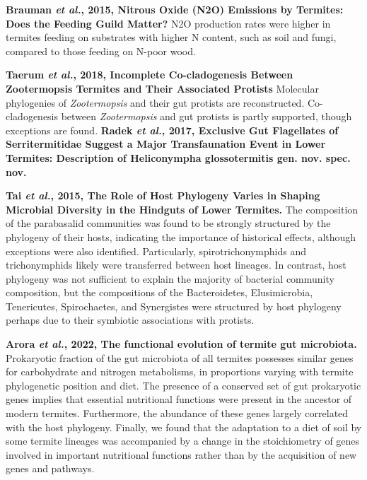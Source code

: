 \documentclass[11pt]{article}
\begin{document}
\begin{sloppypar}
\par
\textbf{Brauman \textit{et al.}, 2015, Nitrous Oxide (N2O) Emissions by Termites: Does the Feeding Guild Matter?} \newline
N2O production rates were higher in termites feeding on substrates with higher N content, such as soil and fungi, compared to those feeding on N-poor wood.
\par
\textbf{Taerum \textit{et al.}, 2018, Incomplete Co-cladogenesis Between Zootermopsis Termites and Their Associated Protists} \newline
Molecular phylogenies of \textit{Zootermopsis} and their gut protists are reconstructed. 
Co-cladogenesis between \textit{Zootermopsis} and gut protists is partly supported, though exceptions are found. 
\textbf{Radek \textit{et al.}, 2017, Exclusive Gut Flagellates of Serritermitidae Suggest a Major Transfaunation Event in Lower Termites: Description of Heliconympha glossotermitis gen. nov. spec. nov.} \newline
\par
\textbf{Tai \textit{et al.}, 2015, The Role of Host Phylogeny Varies in Shaping Microbial Diversity in the Hindguts of Lower Termites.} \newline
The composition of the parabasalid communities was found to be strongly structured by the phylogeny of their hosts, indicating the importance of historical effects, although exceptions were also identified. 
Particularly, spirotrichonymphids and trichonymphids likely were transferred between host lineages. 
In contrast, host phylogeny was not sufficient to explain the majority of bacterial community composition, but the compositions of the Bacteroidetes, Elusimicrobia, Tenericutes, Spirochaetes, and Synergistes were structured by host phylogeny perhaps due to their symbiotic associations with protists.
\par
\textbf{Arora \textit{et al.}, 2022, The functional evolution of termite gut microbiota.} \newline
Prokaryotic fraction of the gut microbiota of all termites possesses similar genes for carbohydrate and nitrogen metabolisms, in proportions varying with termite phylogenetic position and diet. 
The presence of a conserved set of gut prokaryotic genes implies that essential nutritional functions were present in the ancestor of modern termites. 
Furthermore, the abundance of these genes largely correlated with the host phylogeny. 
Finally, we found that the adaptation to a diet of soil by some termite lineages was accompanied by a change in the stoichiometry of genes involved in important nutritional functions rather than by the acquisition of new genes and pathways.

\end{sloppypar}
\end{document}
